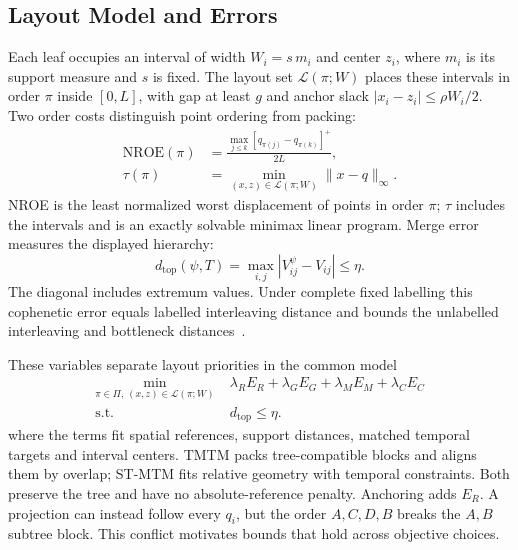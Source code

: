 \documentclass[review]{vgtc}
\newcommand{\dtop}{d_{\mathrm{top}}}
\newcommand{\nroe}{\mathrm{NROE}}
\begin{document}
\subsection{Layout Model and Errors}\label{sec:common}
Each leaf occupies an interval of width $W_i=s\,m_i$ and center $z_i$, where $m_i$ is its support measure and $s$ is fixed. The layout set $\mathcal{L}(\pi;W)$ places these intervals in order $\pi$ inside $[0,L]$, with gap at least $g$ and anchor slack $|x_i-z_i|\le\rho W_i/2$. Two order costs distinguish point ordering from packing:
\begin{equation}\label{eq:nroe}
\begin{aligned}
\nroe(\pi)&=\frac{\max_{j\le k}[q_{\pi(j)}-q_{\pi(k)}]^+}{2L},\\
\tau(\pi)&=\min_{(x,z)\in\mathcal{L}(\pi;W)}\|x-q\|_\infty .
\end{aligned}
\end{equation}
NROE is the least normalized worst displacement of points in order $\pi$; $\tau$ includes the intervals and is an exactly solvable minimax linear program. Merge error measures the displayed hierarchy:
\begin{equation}\label{eq:dtop}
\dtop(\psi,T)=\max_{i,j}|V_{ij}^{\psi}-V_{ij}|\le\eta.
\end{equation}
The diagonal includes extremum values. Under complete fixed labelling this cophenetic error equals labelled interleaving distance and bounds the unlabelled interleaving and bottleneck distances~\cite{Munch:2019:LINF,Gasparovic:2024:IID,Morozov:2013:IDMT}.

These variables separate layout priorities in the common model
\begin{equation}\label{eq:family}
\begin{aligned}
\min_{\pi\in\Pi,\,(x,z)\in\mathcal{L}(\pi;W)}\;&\lambda_RE_R+\lambda_GE_G+\lambda_ME_M+\lambda_CE_C\\
\mathrm{s.t.}\;&\dtop\le\eta.
\end{aligned}
\end{equation}
where the terms fit spatial references, support distances, matched temporal targets and interval centers. TMTM packs tree-compatible blocks and aligns them by overlap; ST-MTM fits relative geometry with temporal constraints. Both preserve the tree and have no absolute-reference penalty. Anchoring adds $E_R$. A projection can instead follow every $q_i$, but the order $A,C,D,B$ breaks the $A,B$ subtree block. This conflict motivates bounds that hold across objective choices.
\end{document}
